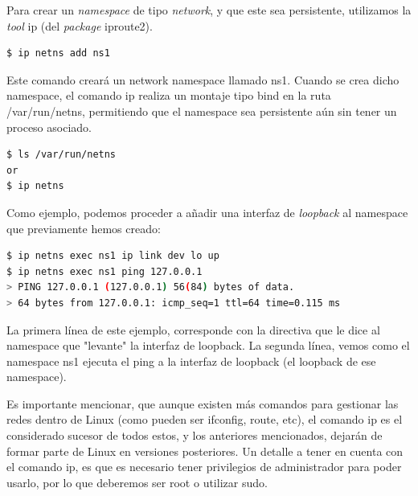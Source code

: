 \documentclass[a4paper, oneside, 12pt]{book}
\begin{document}
	\par \noindent Para crear un \textit{namespace} de tipo \textit{network}, y que este sea persistente, utilizamos la \textit{tool} ip (del \textit{package} iproute2).
	\begin{lstlisting}[language=bash, caption=Creation persistent network namespace]
$ ip netns add ns1
	\end{lstlisting}

	\par \noindent Este comando creará un network namespace llamado ns1. Cuando se crea dicho namespace, el comando ip realiza un montaje tipo bind en la ruta /var/run/netns, permitiendo que el namespace sea persistente aún sin tener un proceso asociado.
	\begin{lstlisting}[language=bash, caption=Comprobar network namespaces existentes]
$ ls /var/run/netns
or
$ ip netns
	\end{lstlisting}
	
	\addvspace{10px}

	\par \noindent Como ejemplo, podemos proceder a añadir una interfaz de \textit{loopback} al namespace que previamente hemos creado:
	\begin{lstlisting}[language=bash, caption=Asignar interfaz loopback a un namespace]
$ ip netns exec ns1 ip link dev lo up
$ ip netns exec ns1 ping 127.0.0.1
> PING 127.0.0.1 (127.0.0.1) 56(84) bytes of data. 
> 64 bytes from 127.0.0.1: icmp_seq=1 ttl=64 time=0.115 ms
	\end{lstlisting}

	\par \noindent La primera línea de este ejemplo, corresponde con la directiva que le dice al namespace que "levante" la interfaz de loopback. La segunda línea, vemos como el namespace ns1 ejecuta el ping a la interfaz de loopback (el loopback de ese namespace).
	
	\addvspace{10px}
	
	\par \noindent Es importante mencionar, que aunque existen más comandos para gestionar las redes dentro de Linux (como pueden ser ifconfig, route, etc), el comando ip es el considerado sucesor de todos estos, y los anteriores mencionados, dejarán de formar parte de Linux en versiones posteriores. Un detalle a tener en cuenta con el comando ip, es que es necesario tener privilegios de administrador para poder usarlo, por lo que deberemos ser root o utilizar sudo.
	
	\addvspace{10px}
	
\end{document}
